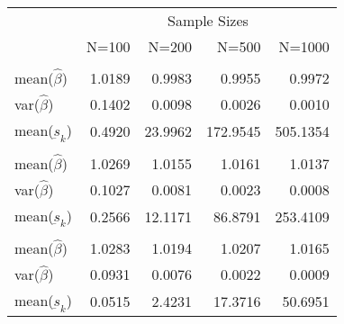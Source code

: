
\begin{tabular}{lrrrr}
\toprule
\multicolumn{1}{c}{ } & \multicolumn{4}{c}{Sample Sizes} \\
\cmidrule(l{3pt}r{3pt}){2-5}
  & N=100 & N=200 & N=500 & N=1000\\
\midrule
\addlinespace[0.3em]
\multicolumn{5}{l}{\textbf{$ \rho = 0 $  }}\\
\hspace{1em}mean($\hat{\beta}$) & 1.0189 & 0.9983 & 0.9955 & 0.9972\\
\hspace{1em}var($\hat{\beta}$) & 0.1402 & 0.0098 & 0.0026 & 0.0010\\
\hspace{1em}mean($\underbar{s}_k$) & 0.4920 & 23.9962 & 172.9545 & 505.1354\\
\addlinespace[0.3em]
\multicolumn{5}{l}{\textbf{$ \rho = 0.5 $}}\\
\hspace{1em}mean($\hat{\beta}$) & 1.0269 & 1.0155 & 1.0161 & 1.0137\\
\hspace{1em}var($\hat{\beta}$) & 0.1027 & 0.0081 & 0.0023 & 0.0008\\
\hspace{1em}mean($\underbar{s}_k$) & 0.2566 & 12.1171 & 86.8791 & 253.4109\\
\addlinespace[0.3em]
\multicolumn{5}{l}{\textbf{$ \rho = 0.9 $}}\\
\hspace{1em}mean($\hat{\beta}$) & 1.0283 & 1.0194 & 1.0207 & 1.0165\\
\hspace{1em}var($\hat{\beta}$) & 0.0931 & 0.0076 & 0.0022 & 0.0009\\
\hspace{1em}mean($\underbar{s}_k$) & 0.0515 & 2.4231 & 17.3716 & 50.6951\\
\bottomrule
\end{tabular}
